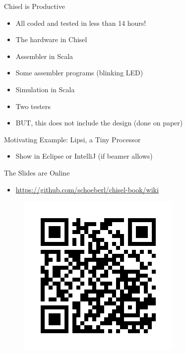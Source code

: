 \documentclass[xcolor=pdflatex,dvipsnames,table]{beamer}
\begin{document}
\begin{frame}[fragile]{Chisel is Productive}
\begin{itemize}
\item All coded and tested in less than 14 hours!
\end{itemize}
\begin{itemize}
\item The hardware in Chisel
\item Assembler in Scala
\item Some assembler programs (blinking LED)
\item Simulation in Scala
\item Two testers
\end{itemize}
\begin{itemize}
\item BUT, this does not include the design (done on paper)
\end{itemize}
\end{frame}

\begin{frame}[fragile]{Motivating Example: Lipsi, a Tiny Processor}
\begin{itemize}
\item Show in Eclipse or IntelliJ (if beamer allows)
\end{itemize}
\end{frame}

\begin{frame}[fragile]{The Slides are Online}
\begin{itemize}
\item \url{https://github.com/schoeberl/chisel-book/wiki}
\end{itemize}
\begin{figure}
    \centering
    \includegraphics[scale=0.5]{slides-link}
\end{figure}
\end{frame}
\end{document}
